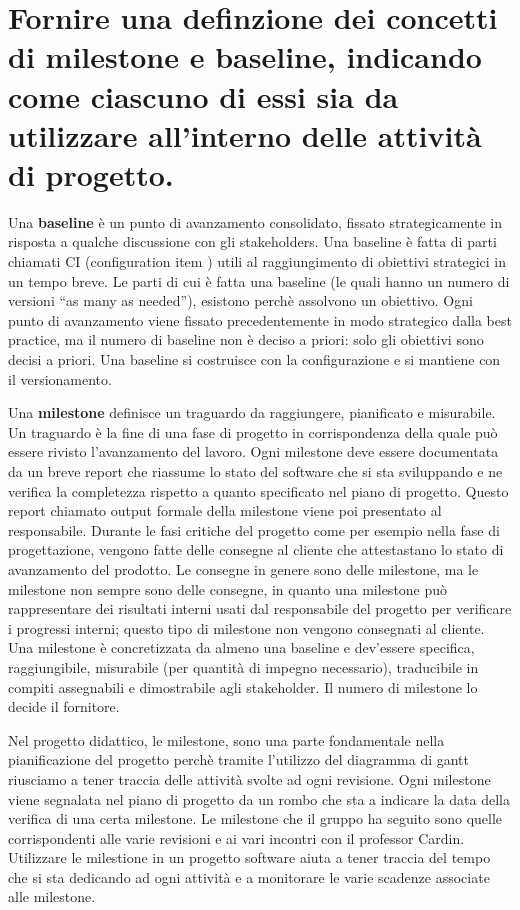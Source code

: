 \section{Fornire una definzione dei concetti di \textbf{milestone} e \textbf{baseline}, indicando come ciascuno di essi sia da utilizzare all'interno delle attività di progetto.}
Una \textbf{baseline} è un punto di avanzamento consolidato, fissato strategicamente in risposta a qualche discussione con gli stakeholders. Una baseline è fatta di parti chiamati CI (configuration item ) utili al raggiungimento di obiettivi strategici in un tempo breve. Le parti di cui è fatta una baseline (le quali hanno un numero di versioni “as many as needed”), esistono perchè assolvono un obiettivo.
Ogni punto di avanzamento viene fissato precedentemente in modo strategico dalla best practice, ma il numero di baseline non è deciso a priori:  solo gli obiettivi sono decisi a priori.
Una baseline si costruisce con la configurazione e si mantiene con il versionamento.

Una \textbf{milestone} definisce un traguardo da raggiungere, pianificato e misurabile. Un traguardo è la fine di una fase di progetto in corrispondenza della quale può essere rivisto l'avanzamento del lavoro. Ogni milestone deve essere documentata da un breve report che riassume lo stato del software che si sta sviluppando e ne verifica la completezza rispetto a quanto specificato nel piano di progetto.
Questo report chiamato output formale della milestone viene poi presentato al responsabile.
Durante le fasi critiche del progetto come per esempio nella fase di progettazione, vengono fatte delle consegne al cliente che attestastano lo stato di avanzamento del prodotto. Le consegne in genere sono delle milestone, ma le milestone non sempre sono delle consegne, in quanto una milestone può rappresentare dei risultati interni usati dal responsabile del progetto per verificare i progressi interni; questo tipo di milestone non vengono consegnati al cliente. Una milestone è concretizzata da almeno una baseline e dev'essere specifica, raggiungibile, misurabile (per quantità di impegno necessario), traducibile in compiti assegnabili e dimostrabile agli stakeholder. Il numero di milestone lo decide il fornitore.


Nel progetto didattico, le milestone, sono una parte fondamentale nella pianificazione del progetto perchè tramite l'utilizzo del diagramma di gantt riusciamo a tener traccia delle attività svolte ad ogni revisione. Ogni milestone viene segnalata nel piano di progetto da un rombo che sta a indicare la data della verifica di una certa milestone. Le milestone che il gruppo ha seguito sono quelle corrispondenti alle varie revisioni e ai vari incontri con il professor Cardin.
Utilizzare le milestione in un progetto software aiuta a tener traccia del tempo che si sta dedicando ad ogni attività e a monitorare le varie scadenze associate alle milestone.